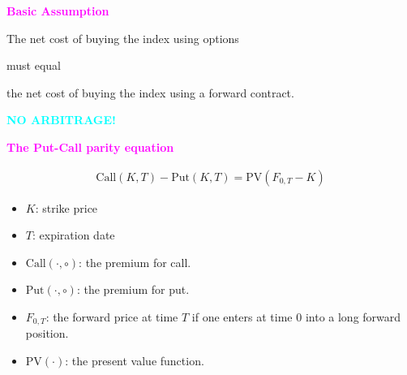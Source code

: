 \begin{frame}[fragile,t]
\begin{center}
	\textcolor{magenta}{\bf Basic Assumption}\\[1em]
	\bigskip

	The net cost of buying the index using options \\
	\bigskip

	must equal \\
	\bigskip

	the net cost of buying the index using a forward contract.

	\bigskip
	\bigskip
	\bigskip

	\pause
	\textcolor{cyan}{\bf \large NO ARBITRAGE!}

\end{center}
\end{frame}
\begin{frame}[fragile]
\begin{center}
	\textcolor{magenta}{\bf The Put-Call parity equation}

	\begin{align*}
		\text{Call}(K,T) - \text{Put}(K,T) = \text{PV}\left(F_{0,T}-K\right)
	\end{align*}
	\pause
	\begin{itemize}
		\item $K$: strike price
		\item $T$: expiration date
		\item $\text{Call}(\cdot,\circ)$: the premium for call.
		\item $\text{Put}(\cdot,\circ)$: the premium for put.
		\item $F_{0,T}$: the forward price at time $T$ if one enters at time $0$ into a long forward position.
		\item $\text{PV}(\cdot)$: the present value function.
	\end{itemize}
\end{center}
\end{frame}
